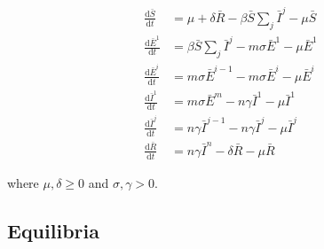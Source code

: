 \documentclass[fleqn]{article}
\begin{document}
\begin{subequations}
\begin{align}
  \frac{\text{d} \bar{S}    }{\text{d} t}
  &= \mu + \delta \bar{R} - \beta \bar{S} \sum\nolimits_{j} \bar{I}^{j} - \mu \bar{S} \\
  \frac{\text{d} \bar{E}^{1}}{\text{d} t}
  &= \beta \bar{S} \sum\nolimits_{j} \bar{I}^{j} - m \sigma \bar{E}^{1} - \mu \bar{E}^{1} \\
  \frac{\text{d} \bar{E}^{i}}{\text{d} t}
  &= m \sigma \bar{E}^{i-1} - m \sigma \bar{E}^{i} - \mu \bar{E}^{i} \\
  \frac{\text{d} \bar{I}^{1}}{\text{d} t}
  &= m \sigma \bar{E}^{m} - n \gamma \bar{I}^{1} - \mu \bar{I}^{1} \\
  \frac{\text{d} \bar{I}^{j}}{\text{d} t}
  &= n \gamma \bar{I}^{j-1} - n \gamma \bar{I}^{j} - \mu \bar{I}^{j} \\
  \frac{\text{d} \bar{R}    }{\text{d} t}
  &= n \gamma \bar{I}^{n} - \delta \bar{R} - \mu \bar{R}
\end{align}
\end{subequations}

where $\mu,\delta \geq 0$ and $\sigma,\gamma > 0$.

\subsection{Equilibria}
\end{document}
